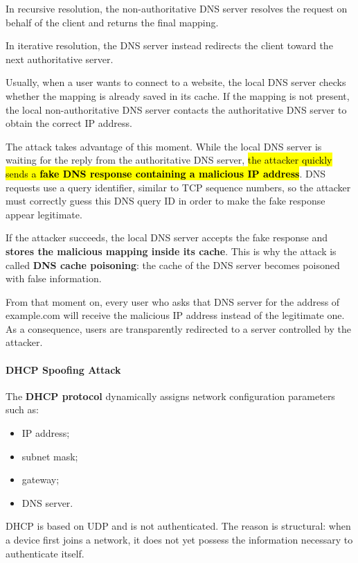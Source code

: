 \documentclass{article}
\begin{document}
In recursive resolution, the non-authoritative DNS server resolves the
request on behalf of the client and returns the final mapping.

In iterative resolution, the DNS server instead redirects the client
toward the next authoritative server.

Usually, when a user wants to connect to a website, the local DNS server
checks whether the mapping is already saved in its cache. If the mapping
is not present, the local non-authoritative DNS server contacts the
authoritative DNS server to obtain the correct IP address.

The attack takes advantage of this moment. While the local DNS server is
waiting for the reply from the authoritative DNS server, \hl{the attacker
quickly sends a \textbf{fake DNS response containing a malicious IP
address}}. DNS requests use a query identifier, similar to TCP
sequence numbers, so the attacker must correctly guess this DNS query ID
in order to make the fake response appear legitimate.

If the attacker succeeds, the local DNS server accepts the fake response
and \textbf{stores the malicious mapping inside its cache}. This is why the
attack is called \textbf{DNS cache poisoning}: the cache of the DNS server
becomes poisoned with false information.

From that moment on, every user who asks that DNS server for the address
of example.com will receive the malicious IP address instead of the
legitimate one. As a consequence, users are transparently redirected to
a server controlled by the attacker.

\paragraph{DHCP Spoofing Attack}

The \textbf{DHCP protocol} dynamically assigns network configuration
parameters such as:

\begin{itemize}
\item IP address;
\item subnet mask;
\item gateway;
\item DNS server.
\end{itemize}

DHCP is based on UDP and is not authenticated. The reason is structural:
when a device first joins a network, it does not yet possess the
information necessary to authenticate itself.
\end{document}
